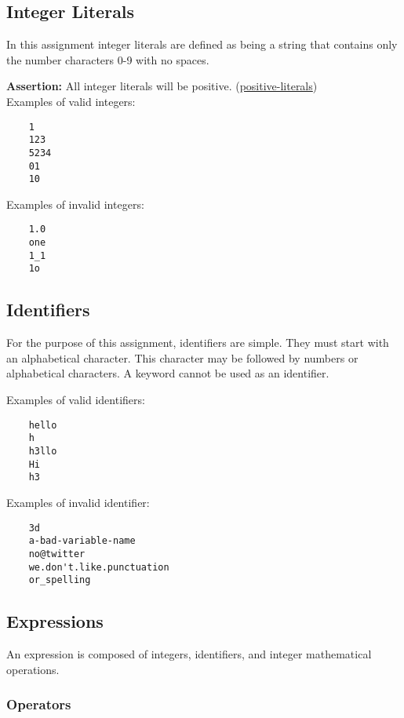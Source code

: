 \documentclass{article}
\newcommand{\assertion}[2]{\textbf{Assertion: }#1 (\hyperlink{#2}{#2})}
\begin{document}
\subsection {Integer Literals}
In this assignment integer literals are defined as being a string that contains only the number
characters 0-9 with no spaces.

\assertion{All integer literals will be positive.}{positive-literals}\\

Examples of valid integers:
\begin{lstlisting}
	1
	123
	5234
	01
	10
\end{lstlisting}

Examples of invalid integers:
\begin{lstlisting}
	1.0
	one
	1_1
	1o
\end{lstlisting}

\subsection{Identifiers}
For the purpose of this assignment, identifiers are simple. They must start with an alphabetical
character. This character may be followed by numbers or alphabetical characters. A keyword cannot
be used as an identifier.

Examples of valid identifiers:
\begin{lstlisting}
	hello
	h
	h3llo
	Hi
	h3
\end{lstlisting}

Examples of invalid identifier:
\begin{lstlisting}
	3d
	a-bad-variable-name
	no@twitter
	we.don't.like.punctuation
	or_spelling
\end{lstlisting}

\subsection{Expressions}
An expression is composed of integers, identifiers, and integer mathematical operations.

\subsubsection{Operators}
\end{document}

